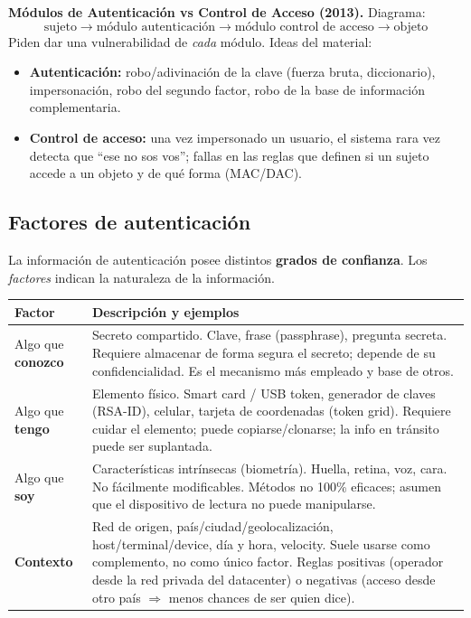 \documentclass[../main.tex]{subfiles}
\begin{document}
\begin{examen}
\textbf{Módulos de Autenticación vs Control de Acceso (2013).} Diagrama:
$$\text{sujeto}\rightarrow\text{módulo autenticación}\rightarrow\text{módulo control de acceso}\rightarrow\text{objeto}$$
Piden dar una vulnerabilidad de \emph{cada} módulo. Ideas del material:
\begin{itemize}[itemsep=1pt]
  \item \textbf{Autenticación:} robo/adivinación de la clave (fuerza bruta, diccionario), impersonación, robo del segundo factor, robo de la base de información complementaria.
  \item \textbf{Control de acceso:} una vez impersonado un usuario, el sistema rara vez detecta que ``ese no sos vos''; fallas en las reglas que definen si un sujeto accede a un objeto y de qué forma (MAC/DAC).
\end{itemize}
\end{examen}

\subsection{Factores de autenticación}

La información de autenticación posee distintos \textbf{grados de confianza}. Los \emph{factores} indican la naturaleza de la información.

\begin{center}
\begin{tabular}{l p{10.5cm}}
\toprule
\textbf{Factor} & \textbf{Descripción y ejemplos} \\
\midrule
Algo que \textbf{conozco} & Secreto compartido. Clave, frase (passphrase), pregunta secreta. Requiere almacenar de forma segura el secreto; depende de su confidencialidad. Es el mecanismo más empleado y base de otros. \\
Algo que \textbf{tengo} & Elemento físico. Smart card / USB token, generador de claves (RSA-ID), celular, tarjeta de coordenadas (token grid). Requiere cuidar el elemento; puede copiarse/clonarse; la info en tránsito puede ser suplantada. \\
Algo que \textbf{soy} & Características intrínsecas (biometría). Huella, retina, voz, cara. No fácilmente modificables. Métodos no 100\% eficaces; asumen que el dispositivo de lectura no puede manipularse. \\
\textbf{Contexto} & Red de origen, país/ciudad/geolocalización, host/terminal/device, día y hora, velocity. Suele usarse como complemento, no como único factor. Reglas positivas (operador desde la red privada del datacenter) o negativas (acceso desde otro país $\Rightarrow$ menos chances de ser quien dice). \\
\bottomrule
\end{tabular}
\end{center}
\end{document}
